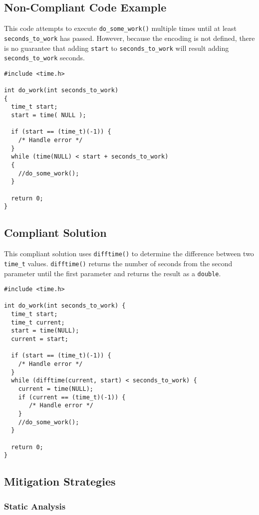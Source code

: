 \subsection{Non-Compliant Code Example}
This code attempts to execute {\tt do\_some\_work()} multiple times until at least {\tt seconds\_to\_work} has passed. However, because the encoding is not defined, there is no guarantee that adding {\tt start} to {\tt seconds\_to\_work} will result adding {\tt seconds\_to\_work} seconds.

\begin{verbatim}
#include <time.h>

int do_work(int seconds_to_work)
{
  time_t start;
  start = time( NULL );

  if (start == (time_t)(-1)) {
    /* Handle error */
  }
  while (time(NULL) < start + seconds_to_work)
  {
    //do_some_work();
  }

  return 0;
}
\end{verbatim}

\subsection{Compliant Solution}
This compliant solution uses {\tt difftime()} to determine the difference between two {\tt time\_t} values. {\tt difftime()} returns the number of seconds from the second parameter until the first parameter and returns the result as a {\tt double}.

\begin{verbatim}
#include <time.h>

int do_work(int seconds_to_work) {
  time_t start;
  time_t current;
  start = time(NULL);
  current = start;

  if (start == (time_t)(-1)) {
    /* Handle error */
  }
  while (difftime(current, start) < seconds_to_work) {
    current = time(NULL);
    if (current == (time_t)(-1)) {
       /* Handle error */
    }
    //do_some_work();
  }

  return 0;
}
\end{verbatim}

\subsection{Mitigation Strategies}
\subsubsection{Static Analysis} 

